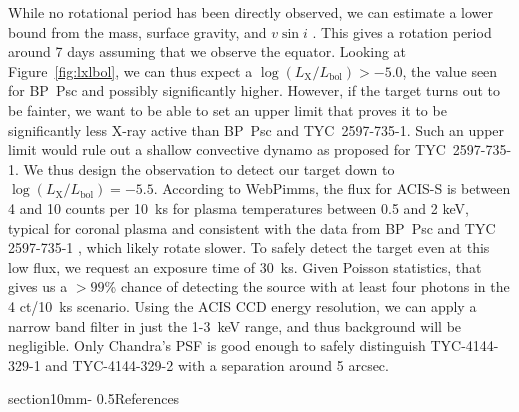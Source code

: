 \documentclass[letterpaper,11pt]{article}
\makeatletter
\renewcommand{\section}{\@startsection%
{section}{1}{0mm}{-\baselineskip}%
{0.5\baselineskip}{\normalfont\Large\bfseries}}%
\makeatother
\begin{document}
While no rotational period has been directly observed, we can estimate a lower bound from the mass, surface gravity, and $v\sin i$ \cite{2009ApJ...696.1964M}. This gives a rotation period around 7 days assuming that we observe the equator. Looking at Figure~\ref{fig:lxlbol}, we can thus expect a $\log(L_\mathrm{X}/L_\mathrm{bol}) > -5.0$, the value seen for BP~Psc and possibly significantly higher. However, if the target turns out to be fainter, we want to be able to set an upper limit that proves it to be significantly less X-ray active than BP~Psc and TYC~2597-735-1. Such an upper limit would rule out a shallow convective dynamo as proposed for TYC~2597-735-1. We thus design the observation to detect our target down to  $\log(L_\mathrm{X}/L_\mathrm{bol}) = -5.5$. According to WebPimms, the flux for ACIS-S is between 4 and 10 counts per 10~ks for plasma temperatures between 0.5 and 2 keV, typical for coronal plasma and consistent with the data from BP~Psc \cite{2010ApJ...719L..65K} and TYC 2597-735-1 \cite{2022arXiv220205424G}, which likely rotate slower. To safely detect the target even at this low flux, we request an exposure time of 30~ks. Given Poisson statistics, that gives us a $>99$\% chance of detecting the source with at least four photons in the 4 ct/10~ks scenario. Using the ACIS CCD energy resolution, we can apply a narrow band filter in just the 1-3~keV range, and thus background will be negligible. Only Chandra's PSF is good enough to safely distinguish TYC-4144-329-1 and TYC-4144-329-2 with a separation around 5 arcsec.










\section{References}


{}



\end{document}

